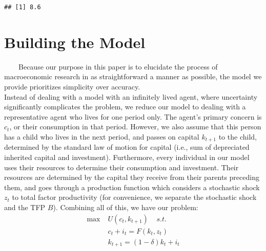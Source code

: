 \documentclass[
]{article}
\newenvironment{Shaded}{\begin{snugshade}}{\end{snugshade}}
\newcommand{\KeywordTok}[1]{\textcolor[rgb]{0.13,0.29,0.53}{\textbf{#1}}}
\newcommand{\NormalTok}[1]{#1}
\newcommand{\OperatorTok}[1]{\textcolor[rgb]{0.81,0.36,0.00}{\textbf{#1}}}
\begin{document}
\begin{Shaded}
\end{Shaded}

\begin{verbatim}
## [1] 8.6
\end{verbatim}

\newpage

\hypertarget{building-the-model}{%
\section{Building the Model}\label{building-the-model}}

~~~~Because our purpose in this paper is to elucidate the process of
macroeconomic research in as straightforward a manner as possible, the
model we provide prioritizes simplicity over accuracy.\\
\hspace*{0.333em}\hspace*{0.333em}\hspace*{0.333em}\hspace*{0.333em}Instead
of dealing with a model with an infinitely lived agent, where
uncertainty significantly complicates the problem, we reduce our model
to dealing with a representative agent who lives for one period only.
The agent's primary concern is \(c_t\), or their consumption in that
period. However, we also assume that this person has a child who lives
in the next period, and passes on capital \(k_{t+1}\) to the child,
determined by the standard law of motion for capital (i.e., sum of
depreciated inherited capital and investment). Furthermore, every
individual in our model uses their resources to determine their
consumption and investment. Their resources are determined by the
capital they receive from their parents preceding them, and goes through
a production function which considers a stochastic shock \(z_t\) to
total factor productivity (for convenience, we separate the stochastic
shock and the TFP \(B\)). Combining all of this, we have our problem:
\[\begin{aligned}
\max \;&U(c_t, k_{t+1}) \; \;\;\; s.t. \\
&c_t + i_t = F(k_t, z_t)  \\
&k_{t+1} = (1 - \delta) k_t + i_t
\end{aligned}\]
\end{document}
